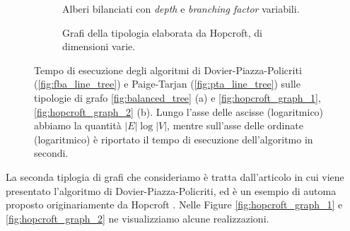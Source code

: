 \begin{figure}
    \begin{subfigure}[t]{0.5\textwidth}
        \caption{Alberi bilanciati con \emph{depth} e \emph{branching factor} variabili.}
        \label{fig:tree_exp_result}
    \end{subfigure}
    \begin{subfigure}[t]{0.5\textwidth}
        \caption{Grafi della tipologia elaborata da Hopcroft, di dimensioni varie.}
        \label{fig:hopcroft_exp_result}
    \end{subfigure}
    \caption{Tempo di esecuzione degli algoritmi di Dovier-Piazza-Policriti (\ref*{fig:fba_line_tree}) e Paige-Tarjan (\ref*{fig:pta_line_tree}) sulle tipologie di grafo \ref{fig:balanced_tree} (a) e \ref{fig:hopcroft_graph_1}, \ref{fig:hopcroft_graph_2} (b). Lungo l'asse delle ascisse (logaritmico) abbiamo la quantità $|E|\log|V|$, mentre sull'asse delle ordinate (logaritmico) è riportato il tempo di esecuzione dell'algoritmo in secondi.}
\end{figure}

La seconda tiplogia di grafi che consideriamo è tratta dall'articolo in cui viene presentato l'algoritmo di Dovier-Piazza-Policriti, ed è un esempio di automa proposto originariamente da Hopcroft \cite{hopcroft}. Nelle Figure \ref{fig:hopcroft_graph_1} e \ref{fig:hopcroft_graph_2} ne visualizziamo alcune realizzazioni.

